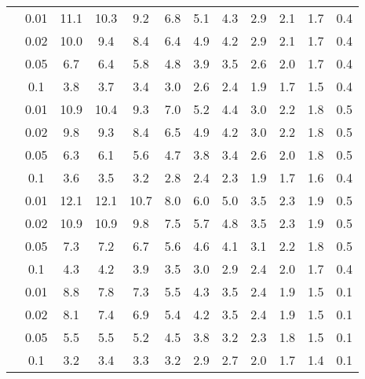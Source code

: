 \begin{tabular}{cccccccccccc}
\hline
[Mn/H] & 0.01 & 11.1 & 10.3 & 9.2 & 6.8 & 5.1 & 4.3 & 2.9 & 2.1 & 1.7 & 0.4 \\
 & 0.02 & 10.0 & 9.4 & 8.4 & 6.4 & 4.9 & 4.2 & 2.9 & 2.1 & 1.7 & 0.4 \\
 & 0.05 & 6.7 & 6.4 & 5.8 & 4.8 & 3.9 & 3.5 & 2.6 & 2.0 & 1.7 & 0.4 \\
 & 0.1 & 3.8 & 3.7 & 3.4 & 3.0 & 2.6 & 2.4 & 1.9 & 1.7 & 1.5 & 0.4 \\
\hline
[Fe/H] & 0.01 & 10.9 & 10.4 & 9.3 & 7.0 & 5.2 & 4.4 & 3.0 & 2.2 & 1.8 & 0.5 \\
 & 0.02 & 9.8 & 9.3 & 8.4 & 6.5 & 4.9 & 4.2 & 3.0 & 2.2 & 1.8 & 0.5 \\
 & 0.05 & 6.3 & 6.1 & 5.6 & 4.7 & 3.8 & 3.4 & 2.6 & 2.0 & 1.8 & 0.5 \\
 & 0.1 & 3.6 & 3.5 & 3.2 & 2.8 & 2.4 & 2.3 & 1.9 & 1.7 & 1.6 & 0.4 \\
\hline
[Co/H] & 0.01 & 12.1 & 12.1 & 10.7 & 8.0 & 6.0 & 5.0 & 3.5 & 2.3 & 1.9 & 0.5 \\
 & 0.02 & 10.9 & 10.9 & 9.8 & 7.5 & 5.7 & 4.8 & 3.5 & 2.3 & 1.9 & 0.5 \\
 & 0.05 & 7.3 & 7.2 & 6.7 & 5.6 & 4.6 & 4.1 & 3.1 & 2.2 & 1.8 & 0.5 \\
 & 0.1 & 4.3 & 4.2 & 3.9 & 3.5 & 3.0 & 2.9 & 2.4 & 2.0 & 1.7 & 0.4 \\
\hline
[Ba/H] & 0.01 & 8.8 & 7.8 & 7.3 & 5.5 & 4.3 & 3.5 & 2.4 & 1.9 & 1.5 & 0.1 \\
 & 0.02 & 8.1 & 7.4 & 6.9 & 5.4 & 4.2 & 3.5 & 2.4 & 1.9 & 1.5 & 0.1 \\
 & 0.05 & 5.5 & 5.5 & 5.2 & 4.5 & 3.8 & 3.2 & 2.3 & 1.8 & 1.5 & 0.1 \\
 & 0.1 & 3.2 & 3.4 & 3.3 & 3.2 & 2.9 & 2.7 & 2.0 & 1.7 & 1.4 & 0.1 \\
\hline
\hline
\end{tabular}
